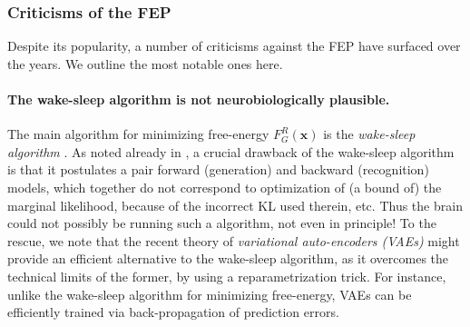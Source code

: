 \documentclass[10pt,letterpaper]{article}
\def\x{\mathbf{x}}
\begin{document}

\subsubsection{Criticisms of the FEP}
  Despite its popularity, a number of criticisms against the FEP have surfaced over the years. We outline the most notable ones here.

\paragraph{The wake-sleep algorithm is not neurobiologically plausible.}
The main algorithm for minimizing free-energy $F_G^R(\x)$ is the \textit{wake-sleep algorithm}
\citep{dayan1995helmholtz}. As noted already in \citep{dayan1995helmholtz},
a crucial drawback of the wake-sleep algorithm is that it postulates a pair forward (generation) and backward (recognition) models,
which together do not correspond to optimization of (a bound of) the marginal likelihood, because of the incorrect KL used therein, etc.
Thus the brain could not possibly be running such a algorithm, not even in principle! To the rescue, we note that the recent theory of
\textit{variational auto-encoders (VAEs)} \citep{kingma2013auto} might provide an efficient alternative to the wake-sleep algorithm,
as it overcomes the technical limits of the former, by using a reparametrization trick. For instance, unlike the wake-sleep algorithm
for minimizing free-energy, VAEs can be efficiently trained via back-propagation of prediction errors.
\end{document}
